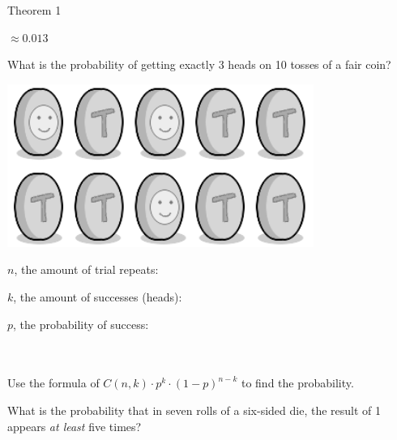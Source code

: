 {\begin{intro}{Theorem 1}
            \begin{center}
                $ \approx 0.013 $
            \end{center}
        \end{intro}

    \newpage

    \begin{questionNOGRADE}{\thequestion}

        What is the probability of getting exactly 3 heads
        on 10 tosses of a fair coin?
        
        \begin{center}
            \includegraphics[width=10cm]{images/6-3-coins.png}
        \end{center}

        \vspace{1cm}
        
        $n$, the amount of trial repeats:
        
        \vspace{1cm}
        
        $k$, the amount of successes (heads):
        
        \vspace{1cm}
        
        $p$, the probability of success:

        ~\\~\\
        Use the formula of $ C(n, k) \cdot p^{k} \cdot (1 - p)^{n-k} $
        to find the probability.
    \end{questionNOGRADE}

    \newpage

        
    \begin{questionNOGRADE}{\thequestion}
        What is the probability that in seven rolls of a six-sided die,
        the result of 1 appears \textit{at least} five times?


\end{questionNOGRADE}}
